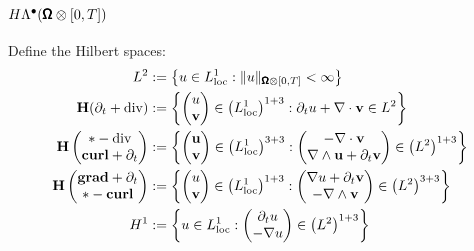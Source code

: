         \subsection*{$H\Lambda^{\bullet}(\pmb{\mathsf{\Omega}}\otimes[0, T])$}
            Define the Hilbert spaces:
            \begin{align}
                L^{2}  &:=  \left\{u \in L^{1}_{\rm loc} : \|u\|_{\pmb{\mathsf{\Omega}}\otimes[0, T]} < \infty\right\}  \\
                \mathbf{H}(\partial_{t} + \mathrm{div})  &:=  \left\{\begin{pmatrix} u \\ \mathbf{v} \end{pmatrix} \in \left(L^{1}_{\rm loc}\right)^{1 + 3} : \partial_{t}u + \nabla\cdot\mathbf{v} \in L^{2}\right\}  \\
                \mathbf{H}\left(\begin{matrix} * - \mathrm{div} \\ \mathbf{curl} + \partial_{t} \end{matrix}\right)  &:=  \left\{\begin{pmatrix} \mathbf{u} \\ \mathbf{v} \end{pmatrix} \in \left(L^{1}_{\rm loc}\right)^{3 + 3} : \begin{pmatrix} - \nabla\cdot\mathbf{v} \\ \nabla\wedge\mathbf{u} + \partial_{t}\mathbf{v} \end{pmatrix} \in \left(L^{2}\right)^{1 + 3}\right\}  \\
                \mathbf{H}\left(\begin{matrix} \mathbf{grad} + \partial_{t} \\ * - \mathbf{curl} \end{matrix}\right)  &:=  \left\{\begin{pmatrix} u \\ \mathbf{v} \end{pmatrix} \in \left(L^{1}_{\rm loc}\right)^{1 + 3} : \begin{pmatrix} \nabla u + \partial_{t}\mathbf{v} \\ - \nabla\wedge\mathbf{v} \end{pmatrix} \in \left(L^{2}\right)^{3 + 3}\right\}  \\
                H^{1}  &:=  \left\{u \in L^{1}_{\rm loc} : \begin{pmatrix} \partial_{t}u \\ - \nabla u \end{pmatrix} \in \left(L^{2}\right)^{1 + 3}\right\}
            \end{align}
